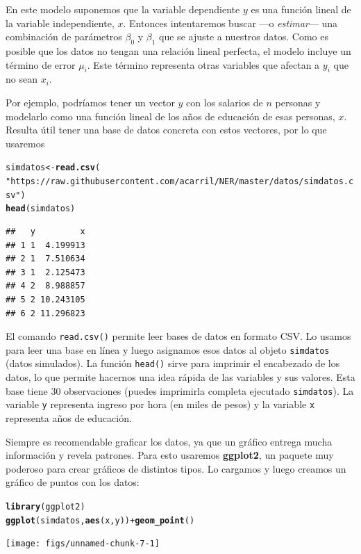 \documentclass{article}\usepackage[]{graphicx}\usepackage[]{color}
\makeatletter
\newcommand{\hlstr}[1]{\textcolor[rgb]{0.192,0.494,0.8}{#1}}%
\newcommand{\hlopt}[1]{\textcolor[rgb]{0,0,0}{#1}}%
\newcommand{\hlstd}[1]{\textcolor[rgb]{0.345,0.345,0.345}{#1}}%
\newcommand{\hlkwb}[1]{\textcolor[rgb]{0.69,0.353,0.396}{#1}}%
\newcommand{\hlkwd}[1]{\textcolor[rgb]{0.737,0.353,0.396}{\textbf{#1}}}%
\newenvironment{kframe}{%
 \def\at@end@of@kframe{}%
 \ifinner\ifhmode%
  \def\at@end@of@kframe{\end{minipage}}%
  \begin{minipage}{\columnwidth}%
 \fi\fi%
 \def\FrameCommand##1{\hskip\@totalleftmargin \hskip-\fboxsep
 \colorbox{shadecolor}{##1}\hskip-\fboxsep
     \hskip-\linewidth \hskip-\@totalleftmargin \hskip\columnwidth}%
 \MakeFramed {\advance\hsize-\width
   \@totalleftmargin\z@ \linewidth\hsize
   \@setminipage}}%
 {\par\unskip\endMakeFramed%
 \at@end@of@kframe}
\newenvironment{knitrout}{}{} %
\newcommand*{\paq}[1]{\textbf{#1}}
\makeatother
\begin{document}
En este modelo suponemos que la variable dependiente $y$ es una función lineal de la variable independiente, $x$. Entonces intentaremos buscar ---o \emph{estimar}--- una combinación de parámetros $\beta_0$ y $\beta_1$ que se ajuste a nuestros datos. Como es posible que los datos no tengan una relación lineal perfecta, el modelo incluye un término de error $\mu_i$. Este término representa otras variables que afectan a $y_i$ que no sean $x_i$.

Por ejemplo, podríamos tener un vector $y$ con los salarios de $n$ personas y modelarlo como una función lineal de los años de educación de esas personas, $x$. Resulta útil tener una base de datos concreta con estos vectores, por lo que usaremos 

\begin{knitrout}
\color{fgcolor}\begin{kframe}
\begin{alltt}
\hlstd{simdatos} \hlkwb{<-} \hlkwd{read.csv}\hlstd{(}
  \hlstr{"https://raw.githubusercontent.com/acarril/NER/master/datos/simdatos.csv"}\hlstd{)}
\hlkwd{head}\hlstd{(simdatos)}
\end{alltt}
\begin{verbatim}
##   y         x
## 1 1  4.199913
## 2 1  7.510634
## 3 1  2.125473
## 4 2  8.988857
## 5 2 10.243105
## 6 2 11.296823
\end{verbatim}
\end{kframe}
\end{knitrout}

El comando \verb|read.csv()| permite leer bases de datos en formato CSV. Lo usamos para leer una base en línea y luego asignamos esos datos al objeto \verb|simdatos| (datos simulados). 
La función \verb|head()| sirve para imprimir el encabezado de los datos, lo que permite hacernos una idea rápida de las variables y sus valores.
Esta base tiene 30 observaciones (puedes imprimirla completa ejecutado \verb|simdatos|). La variable \verb|y| representa ingreso por hora (en miles de pesos) y la variable \verb|x| representa años de educación.

Siempre es recomendable graficar los datos, ya que un gráfico entrega mucha información y revela patrones. Para esto usaremos \paq{ggplot2}, un paquete muy poderoso para crear gráficos de distintos tipos. Lo cargamos y luego creamos un gráfico de puntos con los datos:

\begin{knitrout}
\color{fgcolor}\begin{kframe}
\begin{alltt}
\hlkwd{library}\hlstd{(ggplot2)}
\hlkwd{ggplot}\hlstd{(simdatos,} \hlkwd{aes}\hlstd{(x, y))} \hlopt{+} \hlkwd{geom_point}\hlstd{()}
\end{alltt}
\end{kframe}

{\centering \texttt{[image: figs/unnamed-chunk-7-1]} 

}



\end{knitrout}
\end{document}
